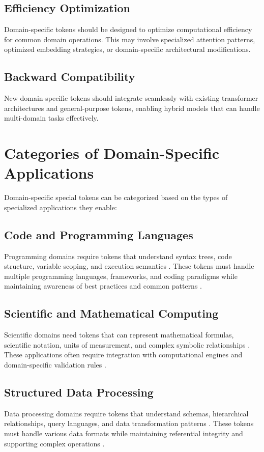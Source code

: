 \subsection{Efficiency Optimization}
Domain-specific tokens should be designed to optimize computational efficiency for common domain operations. This may involve specialized attention patterns, optimized embedding strategies, or domain-specific architectural modifications.

\subsection{Backward Compatibility}
New domain-specific tokens should integrate seamlessly with existing transformer architectures and general-purpose tokens, enabling hybrid models that can handle multi-domain tasks effectively.

\section{Categories of Domain-Specific Applications}

Domain-specific special tokens can be categorized based on the types of specialized applications they enable:

\subsection{Code and Programming Languages}
Programming domains require tokens that understand syntax trees, code structure, variable scoping, and execution semantics \citep{li2022competition, nijkamp2022codegen, wang2023codet5}. These tokens must handle multiple programming languages, frameworks, and coding paradigms while maintaining awareness of best practices and common patterns \citep{roziere2023code}.

\subsection{Scientific and Mathematical Computing}
Scientific domains need tokens that can represent mathematical formulas, scientific notation, units of measurement, and complex symbolic relationships \citep{lewkowycz2022solving, trinh2024solving}. These applications often require integration with computational engines and domain-specific validation rules \citep{yang2023leandojo, azerbayev2023llemma}.

\subsection{Structured Data Processing}
Data processing domains require tokens that understand schemas, hierarchical relationships, query languages, and data transformation patterns \citep{yu2018spider, scholak2021picard}. These tokens must handle various data formats while maintaining referential integrity and supporting complex operations \citep{li2023can, pourreza2024din, gao2023text}.

